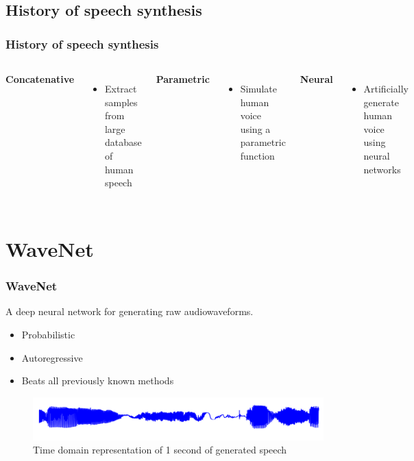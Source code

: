\documentclass{beamer}
\begin{document}
  \subsection{History of speech synthesis}
  \begin{frame}
    \frametitle{History of speech synthesis }
      \begin{columns}
          \textbf{Concatenative}\\
          \begin{itemize}
            \item Extract samples from large database of human speech
          \end{itemize}

          \textbf{Parametric}\\
          \begin{itemize}
            \item Simulate human voice using a parametric function
          \end{itemize}

          \textbf{Neural}\\
          \begin{itemize}
            \item Artificially generate human voice using neural networks
          \end{itemize}
      \end{columns}
  \end{frame}

  \section{WaveNet}
  \begin{frame}
    \frametitle{WaveNet}
      A deep neural network for generating raw audiowaveforms.

      \begin{itemize}
        \item Probabilistic 
        \item Autoregressive
        \item Beats all previously known methods
      \end{itemize}
      \begin{figure}
        \centering
        \includegraphics[width=\textwidth]{images/second_of_speech.png}
        \caption{Time domain representation of 1 second of generated speech}
      \end{figure}
  \end{frame}
\end{document}

